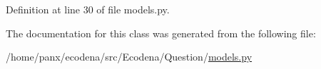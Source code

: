 Definition at line 30 of file models.py.



The documentation for this class was generated from the following file:\begin{DoxyCompactItemize}
\item 
/home/panx/ecodena/src/Ecodena/Question/\hyperlink{_question_2models_8py}{models.py}\end{DoxyCompactItemize}
